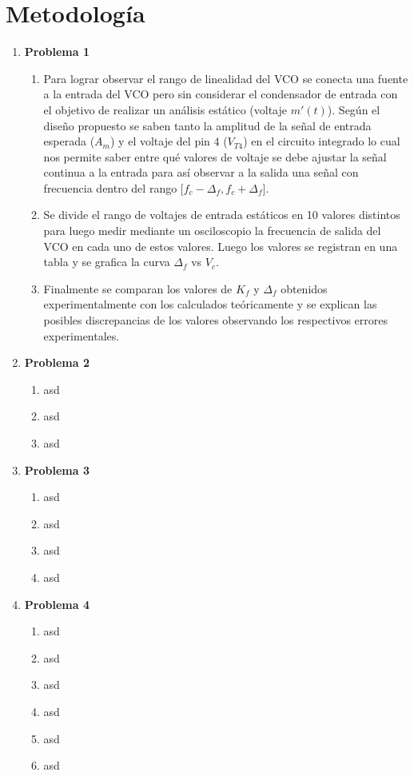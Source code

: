 \documentclass[letterpaper, titlepage]{article}
\begin{document}
\section{Metodología}
	\begin{enumerate}
		\item \textbf{Problema 1}
		\begin{enumerate}
			\item Para lograr observar el rango de linealidad del VCO se conecta una fuente a la entrada del VCO pero sin considerar el condensador de entrada con el objetivo de realizar un análisis estático (voltaje $m'(t)$). Según el diseño propuesto se saben tanto la amplitud de la señal de entrada esperada ($A_m$) y el voltaje del pin 4 ($V_{T4}$) en el circuito integrado lo cual nos permite saber entre qué valores de voltaje se debe ajustar la señal continua a la entrada para así observar a la salida una señal con frecuencia dentro del rango $\big[f_c-\Delta_f,f_c+\Delta_f\big]$.
			\item Se divide el rango de voltajes de entrada estáticos en 10 valores distintos para luego medir mediante un osciloscopio la frecuencia de salida del VCO en cada uno de estos valores. Luego los valores se registran en una tabla y se grafica la curva $\Delta_f$ vs $V_c$.
			\item Finalmente se comparan los valores de $K_f$ y $\Delta_f$ obtenidos experimentalmente con los calculados teóricamente y se explican las posibles discrepancias de los valores observando los respectivos errores experimentales.
		\end{enumerate}
		
		\item \textbf{Problema 2}
		\begin{enumerate}
			\item asd
			\item asd
			\item asd
		\end{enumerate}
		
		\item \textbf{Problema 3}
		\begin{enumerate}
			\item asd
			\item asd
			\item asd
			\item asd
		\end{enumerate}
		
		\item \textbf{Problema 4}
		\begin{enumerate}
			\item asd
			\item asd
			\item asd
			\item asd
			\item asd
			\item asd
		\end{enumerate}
		

\end{enumerate}
\end{document}
